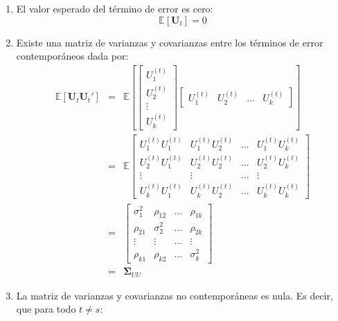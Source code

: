 \documentclass[
]{book}
\begin{document}
\begin{enumerate}
\def\labelenumi{\arabic{enumi}.}
\item
  El valor esperado del término de error es cero:
  \begin{equation}
     \mathbb{E}[\mathbf{U}_t] = 0
    \end{equation}
\item
  Existe una matriz de varianzas y covarianzas entre los términos de error contemporáneos dada por:
  \begin{eqnarray}
     \mathbb{E}[\mathbf{U}_t \mathbf{U}_t'] 
     & = &
     \mathbb{E} \left[
     \begin{bmatrix}
     U^{(t)}_{1} \\ U^{(t)}_{2} \\ \vdots \\ U^{(t)}_{k}
     \end{bmatrix}
     \begin{bmatrix}
     U^{(t)}_{1} & U^{(t)}_{2} & \ldots & U^{(t)}_{k}
     \end{bmatrix}
     \right] \nonumber \\
     & = & \mathbb{E}
     \begin{bmatrix}
     U^{(t)}_{1} U^{(t)}_{1} & U^{(t)}_{1} U^{(t)}_{2} & \ldots & U^{(t)}_{1} U^{(t)}_{k} \\
     U^{(t)}_{2} U^{(t)}_{1} & U^{(t)}_{2} U^{(t)}_{2} & \ldots & U^{(t)}_{2} U^{(t)}_{k} \\
     \vdots & \vdots & \ldots & \vdots \\
     U^{(t)}_{k} U^{(t)}_{1} & U^{(t)}_{k} U^{(t)}_{2} & \ldots & U^{(t)}_{k} U^{(t)}_{k}
     \end{bmatrix} \nonumber \\
     & = & \begin{bmatrix}
     \sigma^2_1 & \rho_{12} & \ldots & \rho_{1k} \\
     \rho_{21} & \sigma^2_2 & \ldots & \rho_{2k} \\
     \vdots & \vdots & \ldots & \vdots \\
     \rho_{k1} & \rho_{k2} & \ldots & \sigma^2_k
     \end{bmatrix} \nonumber \\
     & = & \mathbf{\Sigma}_{UU}
     \label{eq:SigmaVAR}
    \end{eqnarray}
\item
  La matriz de varianzas y covarianzas no contemporáneas es nula. Es decir, que para todo \(t \neq s\):
  \begin{eqnarray}

\end{eqnarray}
\end{enumerate}
\end{document}
